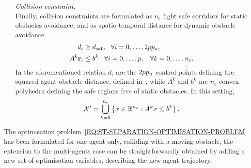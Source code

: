\begin{itemize}
    \item[\emph{Collision}]\emph{constraint}.\\
    Finally, collision constraints are formulated as $n_{\text{c}}$ flght safe corridors for static obstacles avoidance,
    and as spatio-temporal distance for dynamic obstacle avoidance
    \begin{equation*}
        \begin{split}
            d_i & \ge d_{\text{safe}} \hspace{0.3cm} \forall i = 0, \dots, 2 p p_{u}, \\
            A^k \mathbf{r}_i & \le b^k \hspace{0.3cm} \forall i = 0, \dots, p, \hspace{0.3cm} \forall k = 0, \dots, n_{\text{c}}.
        \end{split}
    \end{equation*}
    In the aforementioned relation $d_i$ are the $2 p p_{u}$ control points defining the squared agent-obstacle
    distance, defined in~, while $A^k$ and $b^k$ are $n_{\text{c}}$ convex polyhedra
    defining the safe regions free of static obstacles. In this setting, 
    \begin{equation*}
        \mathcal{X}' = \bigcup_{k = 0}^{n_{\text{c}}} \left \{ x \in \mathbb{R}^{n_{x}} : A^k x \le b^k \right \}.
    \end{equation*}
\end{itemize}
\begin{remark}
    The optimisation problem~\eqref{EQ:ST-SEPARATION-OPTIMISATION-PROBLEM} has been formulated for one agent only,
    colliding with a moving obstacle, the extension to the multi-agents case can be straightforwardly obtained by adding a new set
    of optimisation variables, describing the new agent trajectory.
\end{remark}

